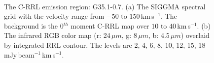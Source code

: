 \documentclass[manuscript]{aastex61}
\newcommand{\kms}{\,km\,s$^{-1}$}
\newcommand{\um}{\mu m}
\begin{document}
\begin{figure}[H]
\centering
{}
\\
\caption{The C-RRL emission region: G35.1-0.7.
          (a) The SIGGMA spectral grid with the velocity range from $-50$ to $150$\kms.
	  The background is the 0$^{th}$ moment C-RRL map over $10$ to $40$\kms.
	  (b) The infrared RGB color map (r: 24\,$\um$, g: 8\,$\um$, b: 4.5\,$\um$) overlaid by integrated RRL contour.
	  The levels are 2, 4, 6, 8, 10, 12, 15, 18 mJy\,beam$^{-1}$\kms.}
\label{fig_crrl-g351}
\end{figure}
\end{document}
